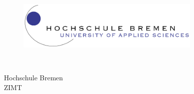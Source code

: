 \thispagestyle{empty}


\begin{figure}[t]
 \centering
 \includegraphics[width=0.8\textwidth]{abb/logo}
\end{figure}


\begin{verbatim}


\end{verbatim}

\begin{center}
\Large{Hochschule Bremen}\\
\Large{ZIMT}\\
\end{center}


